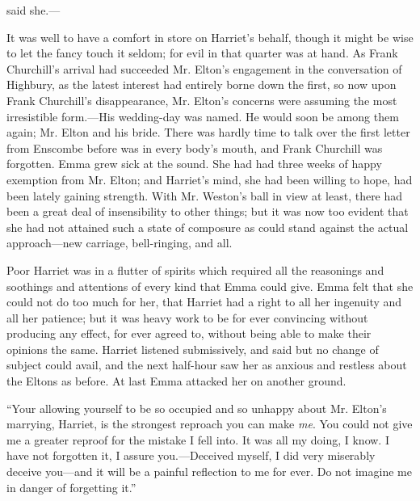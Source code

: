  said she.---

It was well to have a comfort in store on Harriet's behalf, though it might be wise to let the fancy touch it seldom; for evil in that quarter was at hand. As Frank Churchill's arrival had succeeded Mr. Elton's engagement in the conversation of Highbury, as the latest interest had entirely borne down the first, so now upon Frank Churchill's disappearance, Mr. Elton's concerns were assuming the most irresistible form.---His wedding-day was named. He would soon be among them again; Mr. Elton and his bride. There was hardly time to talk over the first letter from Enscombe before  was in every body's mouth, and Frank Churchill was forgotten. Emma grew sick at the sound. She had had three weeks of happy exemption from Mr. Elton; and Harriet's mind, she had been willing to hope, had been lately gaining strength. With Mr. Weston's ball in view at least, there had been a great deal of insensibility to other things; but it was now too evident that she had not attained such a state of composure as could stand against the actual approach---new carriage, bell-ringing, and all.

Poor Harriet was in a flutter of spirits which required all the reasonings and soothings and attentions of every kind that Emma could give. Emma felt that she could not do too much for her, that Harriet had a right to all her ingenuity and all her patience; but it was heavy work to be for ever convincing without producing any effect, for ever agreed to, without being able to make their opinions the same. Harriet listened submissively, and said  but no change of subject could avail, and the next half-hour saw her as anxious and restless about the Eltons as before. At last Emma attacked her on another ground.

“Your allowing yourself to be so occupied and so unhappy about Mr. Elton's marrying, Harriet, is the strongest reproach you can make {\em me}. You could not give me a greater reproof for the mistake I fell into. It was all my doing, I know. I have not forgotten it, I assure you.---Deceived myself, I did very miserably deceive you---and it will be a painful reflection to me for ever. Do not imagine me in danger of forgetting it.”


